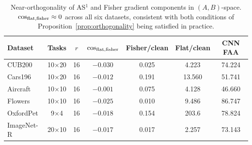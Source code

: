 \begin{table}[h]
\caption{Near-orthogonality of AS$^1$ and Fisher gradient components in $(A,B)$-space.
$\cos_{\mathrm{flat,fisher}} \approx 0$ across all six datasets, consistent with both conditions of
Proposition~\ref{prop:orthogonality} being satisfied in practice.}
\label{tab:cosine}
\centering
\begin{tabular}{lcccccc}
\toprule
Dataset & Tasks & $r$ & $\cos_{\mathrm{flat,fisher}}$ & Fisher/clean & Flat/clean & CNN FAA \\
\midrule
CUB200    & 10$\times$20 & 16 & $-0.030$ & 0.025 & 4.223  & 74.224 \\
Cars196   & 10$\times$20 & 16 & $-0.012$ & 0.191 & 13.560 & 51.741 \\
Aircraft  & 10$\times$10 & 16 & $-0.001$ & 0.075 & 4.128  & 46.660 \\
Flowers   & 10$\times$10 & 16 & $-0.025$ & 0.010 & 9.486  & 86.747 \\
OxfordPet &  9$\times$4  & 16 & $-0.018$ & 0.154 & 203.6  & 78.824 \\
ImageNet-R& 20$\times$10 & 16 & $-0.017$ & 0.017 & 2.257  & 73.143 \\
\bottomrule
\end{tabular}
\end{table}

